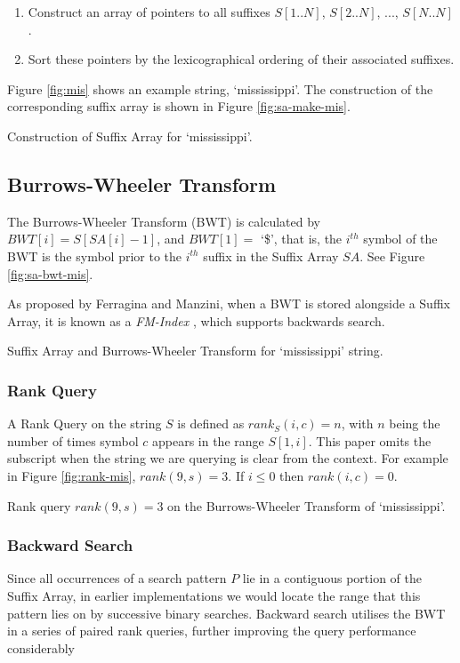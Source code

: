 \begin{enumerate}
	\item
		Construct an array of pointers to all suffixes $S[1..N]$, 
		$S[2..N]$, ..., $S[N..N]$.
	\item
		Sort these pointers by the lexicographical ordering of their associated
		suffixes.
\end{enumerate}

Figure \ref{fig:mis} shows an example string, `mississippi'. The construction of 
the corresponding suffix array is shown in Figure \ref{fig:sa-make-mis}.

			{Construction of Suffix Array for `mississippi'.}



\subsection{Burrows-Wheeler Transform}
The Burrows-Wheeler Transform (BWT) is calculated by $BWT[i] = S[SA[i]-1]$, and $BWT[1] = $ `\$', that is, the $i^{th}$ symbol of the BWT is the symbol prior to the $i^{th}$ suffix in the Suffix Array $SA$. See Figure \ref{fig:sa-bwt-mis}.

As proposed by Ferragina and Manzini, when a BWT is stored alongside a Suffix Array, it is known as a \emph{FM-Index} \cite{ferragina2000}, which supports backwards search.

			{Suffix Array and Burrows-Wheeler Transform for
			`mississippi' string.}

\subsubsection{Rank Query}
A Rank Query on the string $S$ is defined as $rank_S(i, c) = n $, with $n$ being 
the number of times symbol $c$ appears in the range $S[1, i]$. This paper omits 
the subscript when the string we are querying is clear from the context. For 
example in Figure \ref{fig:rank-mis}, $rank(9, s) = 3$. If $i \le 0$ then 
$rank(i, c) = 0$.

			{Rank query $rank(9, s) = 3$ on the Burrows-Wheeler Transform
			of `mississippi'.}

\subsubsection{Backward Search}
Since all occurrences of a search pattern $P$ lie in a contiguous portion of the 
Suffix Array, in earlier implementations we would locate the range that this 
pattern lies on by successive binary searches. Backward search utilises the BWT 
in a series of paired rank queries, further improving the query performance 
considerably ~\cite{claude2008, ferragina2009, ferragina2007, golynski2006, makinen2007b,
makinen2007a, marin2003, navarro2006}

